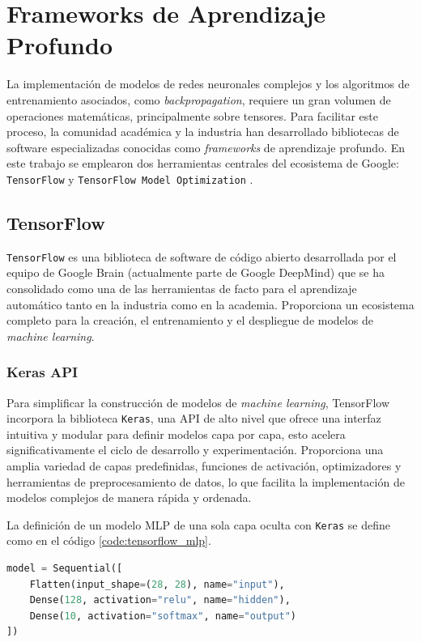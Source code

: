 

\section{Frameworks de Aprendizaje Profundo}

La implementación de modelos de redes neuronales complejos y los algoritmos de entrenamiento asociados, como \textit{backpropagation}, requiere un gran volumen de operaciones matemáticas, principalmente sobre tensores. Para facilitar este proceso, la comunidad académica y la industria han desarrollado bibliotecas de software especializadas conocidas como \textit{frameworks} de aprendizaje profundo. En este trabajo se emplearon dos herramientas centrales del ecosistema de Google: \texttt{TensorFlow} \cite{tensorflow} y \texttt{TensorFlow Model Optimization} \cite{tensorflow-model-optimization}.

\subsection{TensorFlow}

\texttt{TensorFlow} es una biblioteca de software de código abierto desarrollada por el equipo de Google Brain (actualmente parte de Google DeepMind) que se ha consolidado como una de las herramientas de facto para el aprendizaje automático tanto en la industria como en la academia. Proporciona un ecosistema completo para la creación, el entrenamiento y el despliegue de modelos de \textit{machine learning}.

\subsubsection{Keras API}
Para simplificar la construcción de modelos de \textit{machine learning}, TensorFlow incorpora la biblioteca \texttt{Keras}, una API de alto nivel que ofrece una interfaz intuitiva y modular para definir modelos capa por capa, esto acelera significativamente el ciclo de desarrollo y experimentación. Proporciona una amplia variedad de capas predefinidas, funciones de activación, optimizadores y herramientas de preprocesamiento de datos, lo que facilita la implementación de modelos complejos de manera rápida y ordenada.

La definición de un modelo MLP de una sola capa oculta con \texttt{Keras} se define como en el código \ref{code:tensorflow_mlp}.

\begin{lstlisting}[language=Python,label=code:tensorflow_mlp,caption=Definición de un modelo MLP de una sola capa oculta con Keras.]
model = Sequential([
    Flatten(input_shape=(28, 28), name="input"),
    Dense(128, activation="relu", name="hidden"),
    Dense(10, activation="softmax", name="output")
])

\end{lstlisting}

